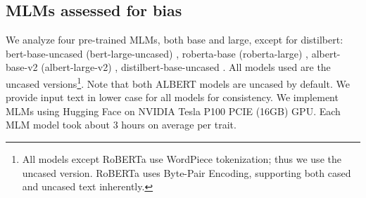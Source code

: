 \subsection{MLMs assessed for bias}
We analyze four pre-trained MLMs, both base and large, except for distilbert:
%
bert-base-uncased (bert-large-uncased) \cite{devlin-etal-2019-bert}, 
%
roberta-base (roberta-large) \cite{roberta-paper}, 
%
albert-base-v2 (albert-large-v2) \cite{albert-paper}, 
%
distilbert-base-uncased \cite{Sanh2019DistilBERTAD}.
%
All models used are the uncased versions\footnote{All models except RoBERTa use WordPiece tokenization; thus we use the uncased version. RoBERTa uses Byte-Pair Encoding, supporting both cased and uncased text inherently.}. Note that both ALBERT models are uncased by default. We provide input text in lower case for all models for consistency. We implement MLMs using Hugging Face on NVIDIA Tesla P100 PCIE (16GB) GPU. Each MLM model took about 3 hours on average per trait.